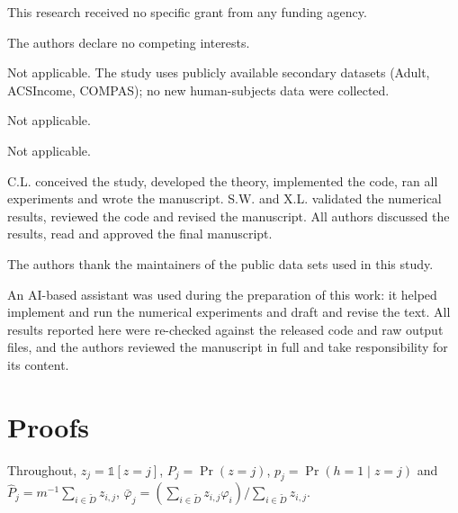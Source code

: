 \documentclass[pdflatex,sn-basic]{sn-jnl}
\newcommand{\Dt}{\tilde D}
\begin{document}

This research received no specific grant from any funding agency.


The authors declare no competing interests.


Not applicable. The study uses publicly available secondary datasets
(Adult, ACSIncome, COMPAS); no new human-subjects data were collected.


Not applicable.


Not applicable.


C.L. conceived the study, developed the theory, implemented
the code, ran all experiments and wrote the manuscript. S.W. and X.L. validated the numerical
results, reviewed the code and revised the manuscript. All authors discussed the results, read and
approved the final manuscript.


The authors thank the maintainers of the public data sets used in
this study.


An AI-based assistant was used during the preparation of this
work: it helped implement and run the numerical experiments and draft and revise the text.  All
results reported here were re-checked against the released code and raw output files, and the
authors reviewed the manuscript in full and take responsibility for its content.

\appendix
\section{Proofs}
\label{app:proofs}

Throughout, $z_j=\mathbb{1}[z=j]$, $P_j=\Pr(z=j)$, $p_j=\Pr(h=1\mid z=j)$ and
$\hat P_j=m^{-1}\sum_{i\in\Dt}z_{i,j}$, $\bar\varphi_j=(\sum_{i\in\Dt}z_{i,j}\varphi_i)/\sum_{i\in\Dt}z_{i,j}$.
\end{document}
